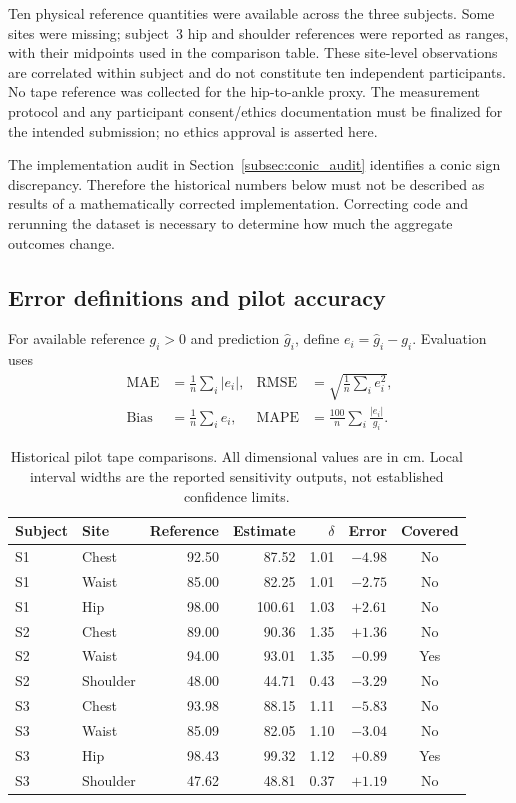 \documentclass[11pt,a4paper]{article}
\numberwithin{equation}{section}
\begin{document}
Ten physical reference quantities were available across the three subjects. Some sites were missing; subject~3 hip and shoulder references were reported as ranges, with their midpoints used in the comparison table. These site-level observations are correlated within subject and do not constitute ten independent participants. No tape reference was collected for the hip-to-ankle proxy. The measurement protocol and any participant consent/ethics documentation must be finalized for the intended submission; no ethics approval is asserted here.

The implementation audit in Section~\ref{subsec:conic_audit} identifies a conic sign discrepancy. Therefore the historical numbers below must not be described as results of a mathematically corrected implementation. Correcting code and rerunning the dataset is necessary to determine how much the aggregate outcomes change.

\subsection{Error definitions and pilot accuracy}
For available reference $g_i>0$ and prediction $\hat g_i$, define $e_i=\hat g_i-g_i$. Evaluation uses
\begin{align}
\operatorname{MAE}&=\frac1n\sum_i|e_i|,&
\operatorname{RMSE}&=\sqrt{\frac1n\sum_i e_i^2},\nonumber\\
\operatorname{Bias}&=\frac1n\sum_i e_i,&
\operatorname{MAPE}&=\frac{100}{n}\sum_i\frac{|e_i|}{g_i}.
\label{eq:error_metrics}
\end{align}
\begin{table}[htbp]
\centering\small
\caption{Historical pilot tape comparisons. All dimensional values are in cm. Local interval widths are the reported sensitivity outputs, not established confidence limits.}
\label{tab:pilot_measurements}
\begin{tabular}{llrrrrc}
\toprule
Subject & Site & Reference & Estimate & $\delta$ & Error & Covered \\
\midrule
S1 & Chest & 92.50 & 87.52 & 1.01 & $-4.98$ & No \\
S1 & Waist & 85.00 & 82.25 & 1.01 & $-2.75$ & No \\
S1 & Hip & 98.00 & 100.61 & 1.03 & $+2.61$ & No \\
S2 & Chest & 89.00 & 90.36 & 1.35 & $+1.36$ & No \\
S2 & Waist & 94.00 & 93.01 & 1.35 & $-0.99$ & Yes \\
S2 & Shoulder & 48.00 & 44.71 & 0.43 & $-3.29$ & No \\
S3 & Chest & 93.98 & 88.15 & 1.11 & $-5.83$ & No \\
S3 & Waist & 85.09 & 82.05 & 1.10 & $-3.04$ & No \\
S3 & Hip & 98.43 & 99.32 & 1.12 & $+0.89$ & Yes \\
S3 & Shoulder & 47.62 & 48.81 & 0.37 & $+1.19$ & No \\
\bottomrule
\end{tabular}
\end{table}
\end{document}
